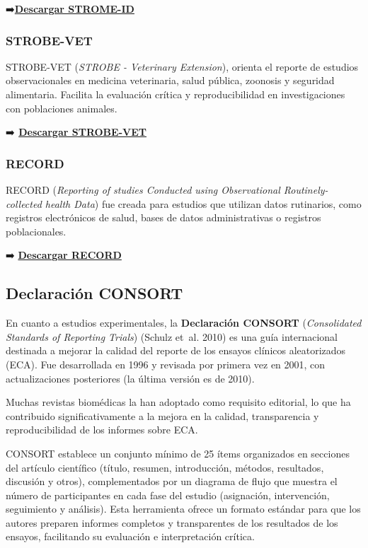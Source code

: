 \documentclass[
  spanish,
  a4paper,
]{scrbook}
\begin{document}
➡\textbf{️\href{https://www.thelancet.com/journals/laninf/article/PIIS1473-3099(13)70324-4/fulltext}{Descargar
STROME-ID}}

\subsubsection{STROBE-VET}\label{strobe-vet}

STROBE-VET (\emph{STROBE - Veterinary Extension}), orienta el reporte de
estudios observacionales en medicina veterinaria, salud pública,
zoonosis y seguridad alimentaria. Facilita la evaluación crítica y
reproducibilidad en investigaciones con poblaciones animales.

➡\textbf{️
\href{https://strobevetstatement.wordpress.com/strobe-vet-statement/}{Descargar
STROBE-VET}}

\subsubsection{RECORD}\label{record}

RECORD (\emph{Reporting of studies Conducted using Observational
Routinely-collected health Data}) fue creada para estudios que utilizan
datos rutinarios, como registros electrónicos de salud, bases de datos
administrativas o registros poblacionales.

➡️
\href{https://journals.plos.org/plosmedicine/article?id=10.1371/journal.pmed.1001885}{\textbf{Descargar
RECORD}}

\subsection{Declaración CONSORT}\label{declaraciuxf3n-consort}

En cuanto a estudios experimentales, la \textbf{Declaración CONSORT}
(\emph{Consolidated Standards of Reporting Trials}) (Schulz et~al. 2010)
es una guía internacional destinada a mejorar la calidad del reporte de
los ensayos clínicos aleatorizados (ECA). Fue desarrollada en 1996 y
revisada por primera vez en 2001, con actualizaciones posteriores (la
última versión es de 2010).

Muchas revistas biomédicas la han adoptado como requisito editorial, lo
que ha contribuido significativamente a la mejora en la calidad,
transparencia y reproducibilidad de los informes sobre ECA.

CONSORT establece un conjunto mínimo de 25 ítems organizados en
secciones del artículo científico (título, resumen, introducción,
métodos, resultados, discusión y otros), complementados por un diagrama
de flujo que muestra el número de participantes en cada fase del estudio
(asignación, intervención, seguimiento y análisis). Esta herramienta
ofrece un formato estándar para que los autores preparen informes
completos y transparentes de los resultados de los ensayos, facilitando
su evaluación e interpretación crítica.
\end{document}
